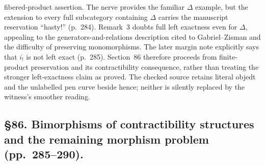 \documentclass[10pt,oneside]{book}
\begin{document}
fibered-product assertion. The nerve provides the familiar $\Delta$ example, but the extension to every full subcategory containing $\Delta$ carries the manuscript reservation “hasty!” (p.\ 284). Remark~3 doubts full left exactness even for $\Delta$, appealing to the generators-and-relations description cited to Gabriel--Zisman and the difficulty of preserving monomorphisms. The later margin note explicitly says that $i_!$ is not left exact (p.\ 285). Section~86 therefore proceeds from finite-product preservation and its contractibility consequence, rather than treating the stronger left-exactness claim as proved. The checked source retains literal objedt and the unlabelled pen curve beside hence; neither is silently replaced by the witness's smoother reading.

\subsection*{\S86. Bimorphisms of contractibility structures and the remaining morphism problem (pp.\ 285--290).}
\end{document}
